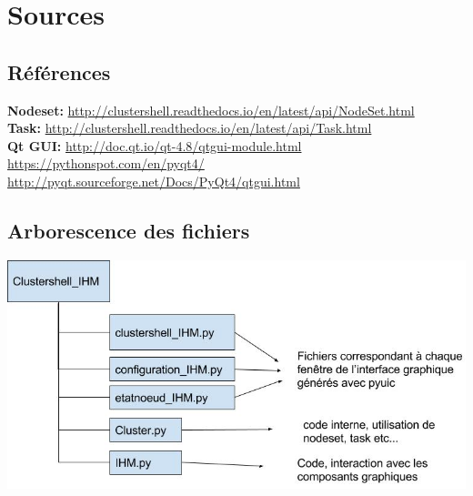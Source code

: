 \documentclass[a4paper,11pt]{article}
\begin{document}
\section{Sources}
\label{sec:section5}
\subsection{Références}
\textbf{Nodeset:} \url{http://clustershell.readthedocs.io/en/latest/api/NodeSet.html}\\
\textbf{Task:} \url{http://clustershell.readthedocs.io/en/latest/api/Task.html}\\
\textbf{Qt GUI:} \url {http://doc.qt.io/qt-4.8/qtgui-module.html}\\
\url {https://pythonspot.com/en/pyqt4/}\\
\url {http://pyqt.sourceforge.net/Docs/PyQt4/qtgui.html} \pagebreak
\subsection{Arborescence des fichiers}
\begin{center}
\includegraphics[scale=0.7]{arborescence_fichiers_IHM.jpg} 
\end{center}
\end{document}
